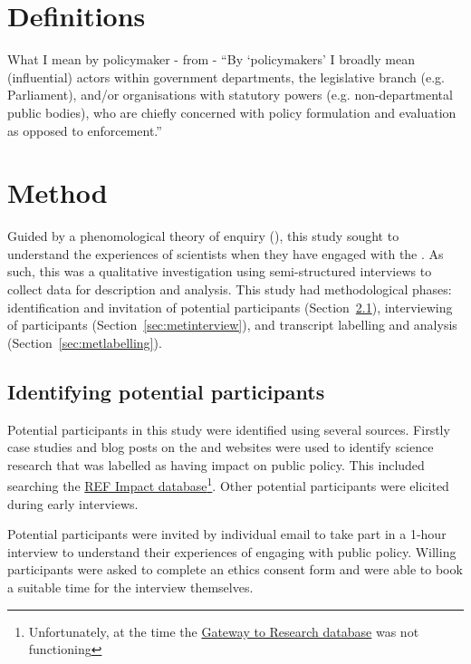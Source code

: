 \section{Definitions}\label{sec:metdefinitions}

What I mean by policymaker - from \cite{Obermeister2020} - ``By `policymakers' I broadly mean (influential) actors within government departments, the legislative branch (e.g. Parliament), and/or organisations with statutory powers (e.g. non-departmental public bodies), who are chiefly concerned with policy formulation and evaluation as opposed to enforcement.''

\section{Method}\label{sec:method}

Guided by a phenomological theory of enquiry (\cite{CreswellP2017}), this study sought to understand the experiences of \CAN{} scientists when they have engaged with the \SPI. As such, this was a qualitative investigation using semi-structured interviews to collect data for description and analysis. This study had  methodological phases: identification and invitation of potential participants (Section~\ref{sec:metidentify}), interviewing of participants (Section~\ref{sec:metinterview}), and transcript labelling and analysis (Section~\ref{sec:metlabelling}). %

\subsection{Identifying potential participants}\label{sec:metidentify}
Potential participants in this study were identified using several sources. Firstly case studies and blog posts on the \REF{} and \UKRI{} websites were used to identify \CAN{} science research that was labelled as having impact on public policy. This included searching the \href{https://results2021.ref.ac.uk/impact}{REF Impact database}\footnote{Unfortunately, at the time the \UKRI{} \href{https://gtr.gtr.ukri.org/}{Gateway to Research database} was not functioning}. Other potential participants were elicited during early interviews.

Potential participants were invited by individual email to take part in a 1-hour interview to understand their experiences of engaging with public policy. Willing participants were asked to complete an ethics consent form and were able to book a suitable time for the interview themselves.

